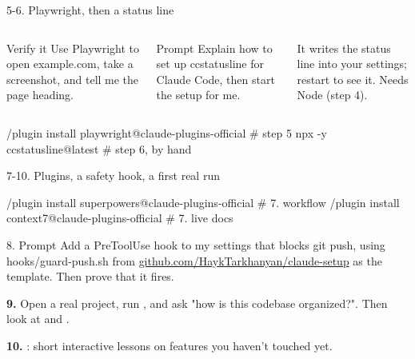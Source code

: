 \documentclass[aspectratio=169,11pt,t]{beamer}
\begin{document}
\begin{frame}[fragile]{5-6. Playwright, then a status line}
  \begin{columns}[T,onlytextwidth]
      \par\vspace{0.3em}
      \begin{callout}[good]{Verify it}
        Use Playwright to open example.com, take a screenshot, and tell me the page heading.
      \end{callout}
      \par\vspace{0.3em}
      \begin{callout}[good]{Prompt}
        Explain how to set up ccstatusline for Claude Code, then start the setup for me.
      \end{callout}
      {\footnotesize\color{muted}It writes the status line into your settings; restart to see it. Needs Node (step 4).}
  \end{columns}\par\vspace{0.3em}
\begin{code}[basicstyle=\ttfamily\scriptsize\color{codefg}]
/plugin install playwright@claude-plugins-official   # step 5
npx -y ccstatusline@latest                           # step 6, by hand
\end{code}
\end{frame}

\begin{frame}[fragile]{7-10. Plugins, a safety hook, a first real run}
\begin{code}[basicstyle=\ttfamily\scriptsize\color{codefg}]
/plugin install superpowers@claude-plugins-official   # 7. workflow
/plugin install context7@claude-plugins-official      # 7. live docs
\end{code}
  \begin{callout}[good]{8. Prompt}
    Add a PreToolUse hook to my settings that blocks git push, using hooks/guard-push.sh from \url{github.com/HaykTarkhanyan/claude-setup} as the template. Then prove that it fires.
  \end{callout}
  \small \textbf{9.} Open a real project, run , and ask "how is this codebase organized?". Then look at  and .\par\vspace{0.25em}
  \textbf{10.} : short interactive lessons on features you haven't touched yet.
\end{frame}
\end{document}
